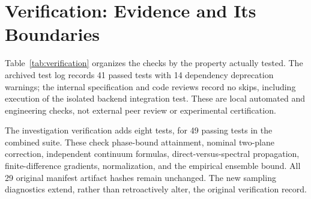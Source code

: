 \documentclass[journal]{IEEEtran}
\begin{document}
\section{Verification: Evidence and Its Boundaries}
Table~\ref{tab:verification} organizes the checks by the property actually tested. The archived test log records 41 passed tests with 14 dependency deprecation warnings; the internal specification and code reviews record no skips, including execution of the isolated backend integration test. These are local automated and engineering checks, not external peer review or experimental certification.

The investigation verification adds eight tests, for 49 passing tests in the combined suite. These check phase-bound attainment, nominal two-plane correction, independent continuum formulas, direct-versus-spectral propagation, finite-difference gradients, normalization, and the empirical ensemble bound. All 29 original manifest artifact hashes remain unchanged. The new sampling diagnostics extend, rather than retroactively alter, the original verification record.
\end{document}
